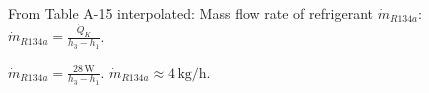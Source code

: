 From Table A-15 interpolated:  
Mass flow rate of refrigerant \( \dot{m}_{R134a} \):  
\( \dot{m}_{R134a} = \frac{\dot{Q}_K}{h_3 - h_1} \).  

\( \dot{m}_{R134a} = \frac{28 \, \text{W}}{h_3 - h_1} \).  
\( \dot{m}_{R134a} \approx 4 \, \text{kg/h} \).